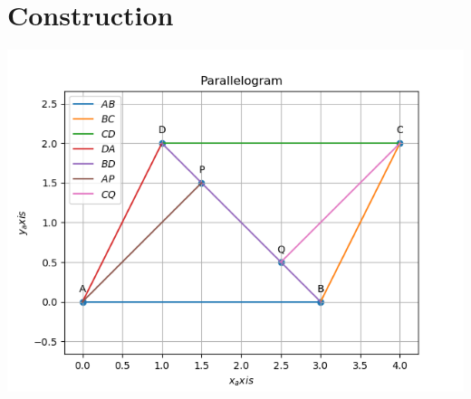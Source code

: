 \documentclass[10pt, a4paper]{article}
\begin{document}
\section{Construction}
\includegraphics[scale=0.66]{matrix_line1.png}
 	

\end{document}
